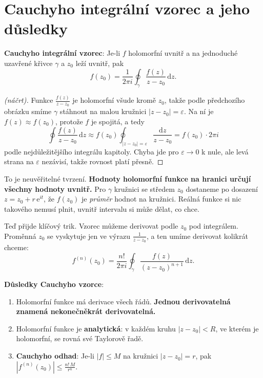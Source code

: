 \section{Cauchyho integrální vzorec a jeho důsledky}

\begin{definitionbox}
  \textbf{Cauchyho integrální vzorec}: Je-li $f$ holomorfní uvnitř a na jednoduché uzavřené křivce $\gamma$ a $z_0$ leží uvnitř, pak
  \begin{equation*}
    f(z_0) = \frac{1}{2\pi i}\oint_\gamma\frac{f(z)}{z - z_0}\,\mathrm{d}z.
  \end{equation*}
\end{definitionbox}

\begin{proof}[(náčrt)]
  Funkce $\frac{f(z)}{z - z_0}$ je holomorfní všude kromě $z_0$, takže podle předchozího obrázku smíme $\gamma$ stáhnout na malou kružnici $|z - z_0| = \varepsilon$. Na ní je $f(z)\approx f(z_0)$, protože $f$ je spojitá, a tedy
  \begin{equation*}
    \oint\frac{f(z)}{z - z_0}\,\mathrm{d}z\approx f(z_0)\oint_{|z - z_0| = \varepsilon}\frac{\mathrm{d}z}{z - z_0} = f(z_0)\cdot 2\pi i
  \end{equation*}
  podle nejdůležitějšího integrálu kapitoly. Chyba jde pro $\varepsilon\to 0$ k nule, ale levá strana na $\varepsilon$ nezávisí, takže rovnost platí přesně.
\end{proof}

To je neuvěřitelné tvrzení. \textbf{Hodnoty holomorfní funkce na hranici určují všechny hodnoty uvnitř.} Pro $\gamma$ kružnici se středem $z_0$ dostaneme po dosazení $z = z_0 + r\,\mathrm{e}^{it}$, že $f(z_0)$ je \textit{průměr} hodnot na kružnici. Reálná funkce si nic takového nemusí plnit, uvnitř intervalu si může dělat, co chce.

Teď přijde klíčový trik. Vzorec můžeme derivovat podle $z_0$ pod integrálem. Proměnná $z_0$ se vyskytuje jen ve výrazu $\frac{1}{z - z_0}$, a ten umíme derivovat kolikrát chceme:
\begin{equation*}
  f^{(n)}(z_0) = \frac{n!}{2\pi i}\oint_\gamma\frac{f(z)}{{(z - z_0)}^{n+1}}\,\mathrm{d}z.
\end{equation*}

\begin{definitionbox}
  \textbf{Důsledky Cauchyho vzorce}:
  \begin{enumerate}
    \item Holomorfní funkce má derivace všech řádů. \textbf{Jednou derivovatelná znamená nekonečněkrát derivovatelná.}
    \item Holomorfní funkce je \textbf{analytická}: v každém kruhu $|z - z_0| < R$, ve kterém je holomorfní, se rovná své Taylorově řadě.
    \item \textbf{Cauchyho odhad}: Je-li $|f|\leq M$ na kružnici $|z - z_0| = r$, pak $|f^{(n)}(z_0)|\leq\frac{n!\,M}{r^n}$.
  \end{enumerate}
\end{definitionbox}

